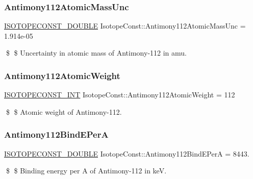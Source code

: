 \subsubsection{\texorpdfstring{Antimony112\+Atomic\+Mass\+Unc}{Antimony112AtomicMassUnc}}
{\footnotesize\ttfamily \mbox{\hyperlink{group___isotope_const-_macros_ga8f45a7272ce02c0b4c65c44636ed719a}{I\+S\+O\+T\+O\+P\+E\+C\+O\+N\+S\+T\+\_\+\+D\+O\+U\+B\+LE}} Isotope\+Const\+::\+Antimony112\+Atomic\+Mass\+Unc = 1.\+914e-\/05}

\$ \$ Uncertainty in atomic mass of Antimony-\/112 in amu. \mbox{\label{group___isotope_const-_antimony-_sb112_ga5553d5191515ff9a7453662fa21ea478}} 
\subsubsection{\texorpdfstring{Antimony112\+Atomic\+Weight}{Antimony112AtomicWeight}}
{\footnotesize\ttfamily \mbox{\hyperlink{group___isotope_const-_macros_ga5f18360b3e99483a35c32d789e62621c}{I\+S\+O\+T\+O\+P\+E\+C\+O\+N\+S\+T\+\_\+\+I\+NT}} Isotope\+Const\+::\+Antimony112\+Atomic\+Weight = 112}

\$ \$ Atomic weight of Antimony-\/112. \mbox{\label{group___isotope_const-_antimony-_sb112_ga3c1a9ffb8b69930256b1357cae9bf9eb}} 
\subsubsection{\texorpdfstring{Antimony112\+Bind\+E\+PerA}{Antimony112BindEPerA}}
{\footnotesize\ttfamily \mbox{\hyperlink{group___isotope_const-_macros_ga8f45a7272ce02c0b4c65c44636ed719a}{I\+S\+O\+T\+O\+P\+E\+C\+O\+N\+S\+T\+\_\+\+D\+O\+U\+B\+LE}} Isotope\+Const\+::\+Antimony112\+Bind\+E\+PerA = 8443.}

\$ \$ Binding energy per A of Antimony-\/112 in keV. \mbox{\label{group___isotope_const-_antimony-_sb112_ga1fbba70a15073228dc7120ddf16d1810}} 
